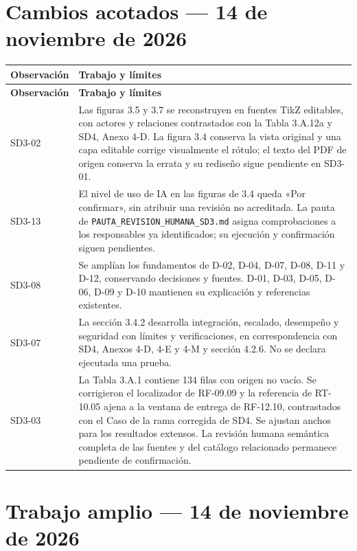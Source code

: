 \documentclass[11pt,letterpaper]{article}
\begin{document}
\section*{Cambios acotados — 14 de noviembre de 2026}

\begin{longtable}{@{}P{0.17\textwidth}P{\tabcolsep\relax}@{}}
\hline
\textbf{Observación} & \textbf{Trabajo y límites} \\
\hline
\endfirsthead
\hline
\textbf{Observación} & \textbf{Trabajo y límites} \\
\hline
\endhead
\hline
\endfoot
SD3-02 & Las figuras 3.5 y 3.7 se reconstruyen en fuentes TikZ editables, con actores y relaciones contrastados con la Tabla 3.A.12a y SD4, Anexo 4-D. La figura 3.4 conserva la vista original y una capa editable corrige visualmente el rótulo; el texto del PDF de origen conserva la errata y su rediseño sigue pendiente en SD3-01. \\
SD3-13 & El nivel de uso de IA en las figuras de 3.4 queda «Por confirmar», sin atribuir una revisión no acreditada. La pauta de \texttt{PAUTA\_REVISION\_HUMANA\_SD3.md} asigna comprobaciones a los responsables ya identificados; su ejecución y confirmación siguen pendientes. \\
SD3-08 & Se amplían los fundamentos de D-02, D-04, D-07, D-08, D-11 y D-12, conservando decisiones y fuentes. D-01, D-03, D-05, D-06, D-09 y D-10 mantienen su explicación y referencias existentes. \\
SD3-07 & La sección 3.4.2 desarrolla integración, escalado, desempeño y seguridad con límites y verificaciones, en correspondencia con SD4, Anexos 4-D, 4-E y 4-M y sección 4.2.6. No se declara ejecutada una prueba. \\
SD3-03 & La Tabla 3.A.1 contiene 134 filas con origen no vacío. Se corrigieron el localizador de RF-09.09 y la referencia de RT-10.05 ajena a la ventana de entrega de RF-12.10, contrastados con el Caso de la rama corregida de SD4. Se ajustan anchos para los resultados extensos. La revisión humana semántica completa de las fuentes y del catálogo relacionado permanece pendiente de confirmación. \\
\end{longtable}

\section*{Trabajo amplio — 14 de noviembre de 2026}
\end{document}
